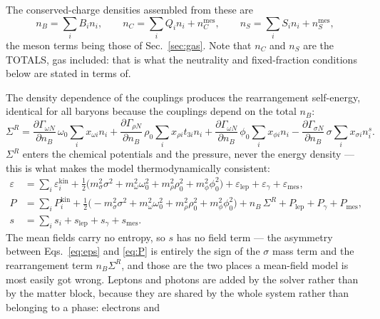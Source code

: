 \documentclass[aps,prc,onecolumn,superscriptaddress,nofootinbib,10pt]{revtex4-2}
\newcommand{\nB}{n_B}
\newcommand{\SigR}{\Sigma^{R}}
\begin{document}
The conserved-charge densities assembled from these are
%
\begin{equation}
\nB = \sum_i B_i n_i , \qquad
n_C = \sum_i Q_i n_i + n_C^{\mathrm{mes}} , \qquad
n_S = \sum_i S_i n_i + n_S^{\mathrm{mes}} ,
\label{eq:charges}
\end{equation}
%
the meson terms being those of Sec.~\ref{sec:gas}. Note that $n_C$ and $n_S$
are the TOTALS, gas included: that is what the neutrality and fixed-fraction
conditions below are stated in terms of.

The density dependence of the couplings produces the rearrangement
self-energy, identical for all baryons because the couplings depend on the
total $\nB$:
%
\begin{equation}
\SigR = \frac{\partial \Gamma_{\omega N}}{\partial \nB}\, \omega_0
        \sum_i x_{\omega i} n_i
      + \frac{\partial \Gamma_{\rho N}}{\partial \nB}\, \rho_0
        \sum_i x_{\rho i} t_{3i} n_i
      + \frac{\partial \Gamma_{\omega N}}{\partial \nB}\, \phi_0
        \sum_i x_{\phi i} n_i
      - \frac{\partial \Gamma_{\sigma N}}{\partial \nB}\, \sigma
        \sum_i x_{\sigma i} n^s_i .
\label{eq:sigmaR}
\end{equation}
%
$\SigR$ enters the chemical potentials and the pressure, never the energy
density --- this is what makes the model thermodynamically consistent:
%
\begin{align}
\varepsilon &= \sum_i \varepsilon^{\mathrm{kin}}_i
  + \tfrac12 \big( m_\sigma^2 \sigma^2 + m_\omega^2 \omega_0^2
                 + m_\rho^2 \rho_0^2 + m_\phi^2 \phi_0^2 \big)
  + \varepsilon_{\mathrm{lep}} + \varepsilon_\gamma + \varepsilon_{\mathrm{mes}},
\label{eq:eps}\\
P &= \sum_i P^{\mathrm{kin}}_i
  + \tfrac12 \big( -m_\sigma^2 \sigma^2 + m_\omega^2 \omega_0^2
                 + m_\rho^2 \rho_0^2 + m_\phi^2 \phi_0^2 \big)
  + \nB\, \SigR + P_{\mathrm{lep}} + P_\gamma + P_{\mathrm{mes}} ,
\label{eq:P}\\
s &= \sum_i s_i + s_{\mathrm{lep}} + s_\gamma + s_{\mathrm{mes}} .
\label{eq:s}
\end{align}
%
The mean fields carry no entropy, so $s$ has no field term --- the asymmetry
between Eqs.~\eqref{eq:eps} and \eqref{eq:P} is entirely the sign of the
$\sigma$ mass term and the rearrangement term $\nB \SigR$, and those are the
two places a mean-field model is most easily got wrong. Leptons and photons
are added by the solver rather than by the matter block, because they are
shared by the whole system rather than belonging to a phase: electrons and
\end{document}
